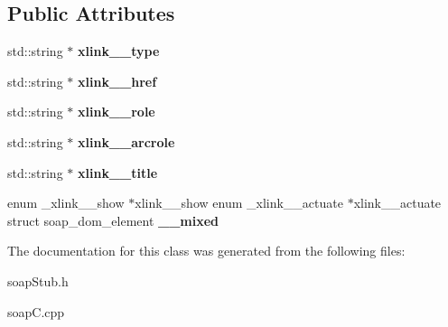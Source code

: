 \subsection*{Public Attributes}
\begin{DoxyCompactItemize}
\item 
\hypertarget{class__pass____References__ReferenceObj_a897591610fe35bf3d8bd38f960505440}{
std::string $\ast$ {\bfseries xlink\_\-\_\-type}}
\label{class__pass____References__ReferenceObj_a897591610fe35bf3d8bd38f960505440}

\item 
\hypertarget{class__pass____References__ReferenceObj_a5d12486cbfad578461537ea5cd7e2e96}{
std::string $\ast$ {\bfseries xlink\_\-\_\-href}}
\label{class__pass____References__ReferenceObj_a5d12486cbfad578461537ea5cd7e2e96}

\item 
\hypertarget{class__pass____References__ReferenceObj_aafce46aa81592127bf9e172d2b20b45c}{
std::string $\ast$ {\bfseries xlink\_\-\_\-role}}
\label{class__pass____References__ReferenceObj_aafce46aa81592127bf9e172d2b20b45c}

\item 
\hypertarget{class__pass____References__ReferenceObj_a1b945540edd1356aa9391b8dcd39eac8}{
std::string $\ast$ {\bfseries xlink\_\-\_\-arcrole}}
\label{class__pass____References__ReferenceObj_a1b945540edd1356aa9391b8dcd39eac8}

\item 
\hypertarget{class__pass____References__ReferenceObj_af933a8fa8fffe64d3c38c96c7c74861c}{
std::string $\ast$ {\bfseries xlink\_\-\_\-title}}
\label{class__pass____References__ReferenceObj_af933a8fa8fffe64d3c38c96c7c74861c}

\item 
\hypertarget{class__pass____References__ReferenceObj_af1bb6844ef41ca1efdd7a8326dd546f5}{
enum \_\-xlink\_\-\_\-show $\ast$xlink\_\-\_\-show enum \_\-xlink\_\-\_\-actuate $\ast$xlink\_\-\_\-actuate struct soap\_\-dom\_\-element {\bfseries \_\-\_\-mixed}}
\label{class__pass____References__ReferenceObj_af1bb6844ef41ca1efdd7a8326dd546f5}

\end{DoxyCompactItemize}


The documentation for this class was generated from the following files:\begin{DoxyCompactItemize}
\item 
soapStub.h\item 
soapC.cpp\end{DoxyCompactItemize}
